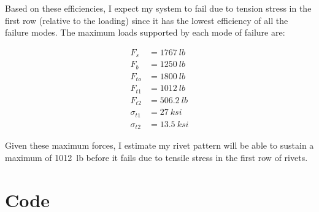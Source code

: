\documentclass[12 pt]{article}
\begin{document}
Based on these efficiencies, I expect my system to fail due to tension stress in the first row (relative to the loading) since it has the lowest efficiency of all the failure modes. The maximum loads supported by each mode of failure are:

\begin{align*}
F_s&=\qty{1767}{lb} \\
F_b&=\qty{1250}{lb} \\
F_{to}&=\qty{1800}{lb} \\
F_{t1}&=\qty{1012}{lb} \\
F_{t2}&=\qty{506.2}{lb} \\
\sigma_{t1}&=\qty{27}{ksi} \\
\sigma_{t2}&=\qty{13.5}{ksi}
\end{align*}

Given these maximum forces, I estimate my rivet pattern will be able to sustain a maximum of \qty{1012}{lb} before it fails due to tensile stress in the first row of rivets.

\section*{Code} \label{code}












\end{document}
